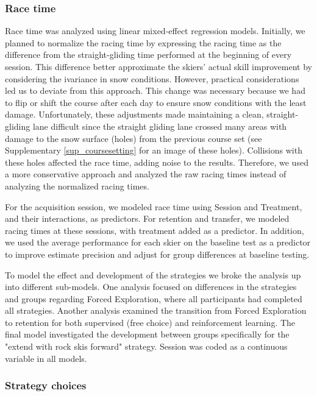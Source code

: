 \documentclass[pdflatex,sn-mathphys-num]{sn-jnl}%
\theoremstyle{thmstyleone}%
\theoremstyle{thmstyletwo}%
\theoremstyle{thmstylethree}%
\begin{document}
 \subsubsection{Race time}

Race time was analyzed using linear mixed-effect regression models. Initially, we planned to normalize the racing time by expressing the racing time as the difference from the straight-gliding time performed at the beginning of every session. This difference better approximate the skiers' actual skill improvement by considering the ivariance in snow conditions. However, practical considerations led us to deviate from this approach. This change was necessary because we had to flip or shift the course after each day to ensure snow conditions with the least damage. Unfortunately, these adjustments made maintaining a clean, straight-gliding lane difficult since the straight gliding lane crossed many areas with damage to the snow surface (holes) from the previous course set (see Supplementary \ref{sup_coursesetting} for an image of these holes). Collisions with these holes affected the race time, adding noise to the results. Therefore, we used a more conservative approach and analyzed the raw racing times instead of analyzing the normalized racing times.

For the acquisition session, we modeled race time using Session and Treatment, and their interactions, as predictors. For retention and transfer, we modeled racing times at these sessions, with treatment added as a predictor. In addition, we used the average performance for each skier on the baseline test as a predictor to improve estimate precision and adjust for group differences at baseline testing. 

To model the effect and development of the strategies we broke the analysis up into different sub-models. One analysis focused on differences in the strategies and groups regarding Forced Exploration, where all participants had completed all strategies. Another analysis examined the transition from Forced Exploration to retention for both supervised (free choice) and reinforcement learning. The final model investigated the development between groups specifically for the "extend with rock skis forward" strategy. Session was coded as a continuous variable in all models. 


\subsubsection{Strategy choices}
\end{document}
